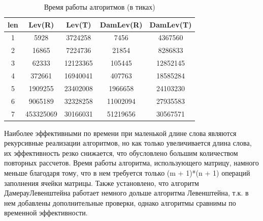 \documentclass[12pt]{report}
\begin{document}
\begin{table} [h!]
\caption{Время работы алгоритмов (в тиках)}
	\begin{tabular}{|c c c c c|} 
 	\hline
	len & Lev(R) & Lev(T) & DamLev(R) & DamLev(T) \\ [0.8ex] 
 	\hline\hline
 	1 & 5928 & 3724258 & 7456 & 4367560\\
 	\hline
 	2 & 16865 & 7224736 & 21854 & 8286833\\
 	\hline
	3 & 62333 & 12123365 & 105445 & 12852145\\
	\hline
	4 & 372661 & 16940041 & 407763 & 18585284\\
	\hline
	5 & 1909255 & 23402008 & 1966658 & 24103230\\
	\hline
	6 & 9065189 & 32328258 & 11002094 & 27935583\\
	\hline
	7 & 453325069 & 30166031 & 51219656 & 30567571\\
	\hline
	\end{tabular}
\end{table}




\par
Наиболее эффективными по времени при маленькой длине слова являются рекурсивные реализации алгоритмов, но как только увеличивается длина слова, их эффективность резко снижается, что обусловлено большим количеством повторных рассчетов. Время работы алгоритма, использующего матрицу, намного меньше благодаря тому, что в нем требуется только (m + 1)*(n + 1) операций заполнения ячейки матрицы. Также установлено, что алгоритм ДамерауЛевенштейна работает немного дольше алгоритма Левенштейна, т.к. в нем добавлены дополнительные проверки, однако алгоритмы сравнимы по временной эффективности.
\end{document}
